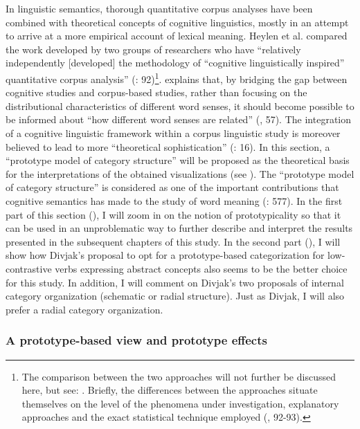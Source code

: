In linguistic semantics, thorough quantitative corpus analyses have been combined with theoretical concepts of cognitive linguistics, mostly in an attempt to arrive at a more empirical account of lexical meaning. Heylen et al. compared the work developed by two groups of researchers who have “relatively independently [developed] the methodology of “cognitive linguistically inspired” quantitative corpus analysis” (\citealt{kristiansen_methodological_2008}: 92)\footnote{The comparison between the two approaches will not further be discussed here, but see: \citet{kristiansen_methodological_2008}. Briefly, the differences between the approaches situate themselves on the level of the phenomena under investigation, explanatory approaches and the exact statistical technique employed (\citealt{kristiansen_methodological_2008}, 92-93).}. \citet{Gries2006b} explains that, by bridging the gap between cognitive studies and corpus-based studies, rather than focusing on the distributional characteristics of different word senses, it should become possible to be informed about “how different word senses are related” (\citealt{Gries2006b}, 57). The integration of a cognitive linguistic framework within a corpus linguistic study is moreover believed to lead to more “theoretical sophistication” (\citealt{gilquin_corpus_2010}: 16). In this section, a “prototype model of category structure” will be proposed as the theoretical basis for the interpretations of the obtained visualizations (see ). The “prototype model of category structure” is considered as one of the important contributions that cognitive semantics has made to the study of word meaning (\citealt{allan_lexical_2013}: 577). In the first part of this section (), I will zoom in on the notion of prototypicality so that it can be used in an unproblematic way to further describe and interpret the results presented in the subsequent chapters of this study. In the second part (), I will show how Divjak’s proposal to opt for a prototype-based categorization for low-contrastive verbs expressing abstract concepts also seems to be the better choice for this study. In addition, I will comment on Divjak’s two proposals of internal category organization (schematic or radial structure). Just as Divjak, I will also prefer a radial category organization.


\subsubsection{\label{sec:2.4.3.1}  A prototype-based view and prototype effects}

